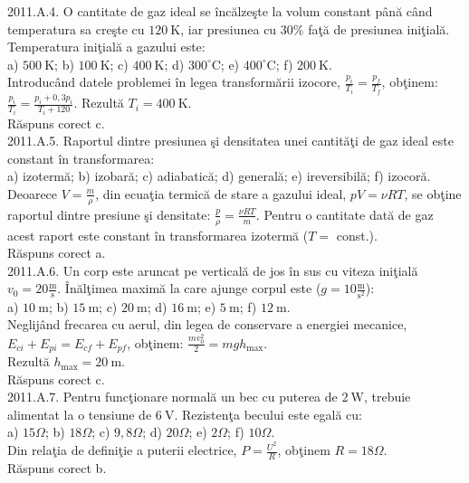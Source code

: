 2011.A.4. O cantitate de gaz ideal se încălzeşte la volum constant până când temperatura sa creşte cu $120 \mathrm{~K}$, iar presiunea cu $30 \%$ faţă de presiunea iniţială. Temperatura iniţială a gazului este:\\ a) $500 \mathrm{~K}$; b) $100 \mathrm{~K}$; c) $400 \mathrm{~K}$; d) $300^{\circ} \mathrm{C}$; e) $400^{\circ} \mathrm{C}$; f) $200 \mathrm{~K}$.\\ Introducând datele problemei în legea transformării izocore, $\frac{p_{i}}{T_{i}}=\frac{p_{f}}{T_{f}}$, obţinem: $\frac{p_{i}}{T_{i}}=\frac{p_{i}+0,3 p_{i}}{T_{i}+120}$. Rezultă $T_{i}=400 \mathrm{~K}$.\\ Răspuns corect c.\\

2011.A.5. Raportul dintre presiunea şi densitatea unei cantităţi de gaz ideal este constant în transformarea:\\ a) izotermă; b) izobară; c) adiabatică; d) generală; e) ireversibilă; f) izocoră.\\ Deoarece $V=\frac{m}{\rho}$, din ecuaţia termică de stare a gazului ideal, $p V=\nu R T$, se obţine raportul dintre presiune şi densitate: $\frac{p}{\rho}=\frac{\nu R T}{m}$. Pentru o cantitate dată de gaz acest raport este constant în transformarea izotermă ($T=$ const.).\\ Răspuns corect a.\\

2011.A.6. Un corp este aruncat pe verticală de jos în sus cu viteza iniţială $v_{0}=20 \frac{\mathrm{m}}{\mathrm{s}}$. Înălţimea maximă la care ajunge corpul este ($g=10 \frac{\mathrm{m}}{\mathrm{s}^{2}}$):\\ a) $10 \mathrm{~m}$; b) $15 \mathrm{~m}$; c) $20 \mathrm{~m}$; d) $16 \mathrm{~m}$; e) $5 \mathrm{~m}$; f) $12 \mathrm{~m}$.\\ Neglijând frecarea cu aerul, din legea de conservare a energiei mecanice, $E_{c i}+E_{p i}=E_{c f}+E_{p f}$, obţinem: $\frac{m v_{0}^{2}}{2}=m g h_{\text {max}}$.\\ Rezultă $h_{\text {max}}=20 \mathrm{~m}$.\\ Răspuns corect c.\\

2011.A.7. Pentru funcţionare normală un bec cu puterea de $2 \mathrm{~W}$, trebuie alimentat la o tensiune de $6 \mathrm{~V}$. Rezistenţa becului este egală cu:\\ a) $15 \Omega$; b) $18 \Omega$; c) $9,8 \Omega$; d) $20 \Omega$; e) $2 \Omega$; f) $10 \Omega$.\\ Din relaţia de definiţie a puterii electrice, $P=\frac{U^{2}}{R}$, obţinem $R=18 \Omega$.\\ Răspuns corect b.\\

